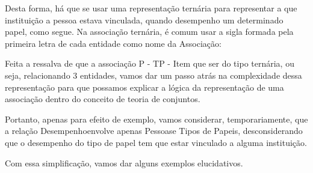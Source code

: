 \documentclass[
12pt,		%
openright,	%
twoside,  %
a4paper,			%
chapter=TITLE,		%
english,			%
french,				%
spanish,			%
brazil				%
]{USPSC-classe/USPSC}
\begin{document}
Desta forma, h\'a que se usar uma representa\c{c}\~ao tern\'aria para representar \textquotedbl a que institui\c{c}\~ao a pessoa estava vinculada, quando desempenho um determinado papel\textquotedbl , como segue. Na associa\c{c}\~ao tern\'aria, \'e comum usar a sigla formada pela primeira letra de cada entidade como nome da Associa\c{c}\~ao:
















Feita a ressalva de que a associa\c{c}\~ao \textquotedbl P - TP - I\textquotedbl  tem que ser do tipo tern\'aria, ou seja, relacionando 3 entidades, vamos dar um passo atr\'as na complexidade dessa representa\c{c}\~ao para que possamos explicar a l\'ogica da representa\c{c}\~ao de uma associa\c{c}\~ao dentro do conceito de teoria de conjuntos.














Portanto, apenas para efeito de exemplo, vamos considerar, temporariamente, que a rela\c{c}\~ao \textquotedbl Desempenho\textquotedbl  envolve apenas \textquotedbl Pessoas\textquotedbl  e \textquotedbl Tipos de Papeis\textquotedbl , desconsiderando que o desempenho do tipo de papel tem que estar vinculado a alguma institui\c{c}\~ao.














Com essa simplifica\c{c}\~ao, vamos dar alguns exemplos elucidativos.
\end{document}
